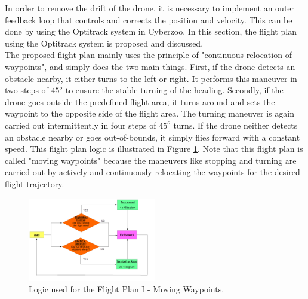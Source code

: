 In order to remove the drift of the drone, it is necessary to implement an outer feedback loop that controls and corrects the position and velocity. This can be done by using the Optitrack system in Cyberzoo. In this section, the flight plan using the Optitrack system is proposed and discussed. \\

The proposed flight plan mainly uses the principle of "continuous relocation of waypoints", and simply does the two main things. First, if the drone detects an obstacle nearby, it either turns to the left or right. It performs this maneuver in two steps of $45^o$ to ensure the stable turning of the heading. Secondly, if the drone goes outside the predefined flight area, it turns around and sets the waypoint to the opposite side of the flight area. The turning maneuver is again carried out intermittently in four steps of $45^o$ turns. If the drone neither detects an obstacle nearby or goes out-of-bounds, it simply flies forward with a constant speed. This flight plan logic is illustrated in Figure \ref{fp1}. Note that this flight plan is called "moving waypoints" because the maneuvers like stopping and turning are carried out by actively and continuously relocating the waypoints for the desired flight trajectory.

\begin{figure}[H]
	\centering
	\includegraphics[width = 0.5\textwidth]{Figures/FP1.png}
	\caption{Logic used for the Flight Plan I - Moving Waypoints.}
	\label{fp1}
\end{figure}